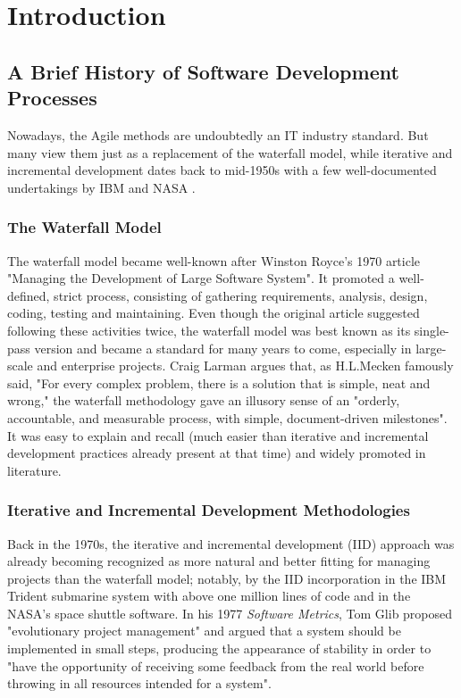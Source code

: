 \documentclass{article}
\begin{document}
\section{Introduction}
\subsection{A Brief History of Software Development Processes}
Nowadays, the Agile methods are undoubtedly an IT industry standard. But many view them just as a replacement of the waterfall model, while iterative and incremental development dates back to mid-1950s with a few well-documented undertakings by IBM and NASA \cite{larman2003iterative}.

\subsubsection{The Waterfall Model}
The waterfall model became well-known after Winston Royce's 1970 article "Managing the Development of Large Software System". It promoted a well-defined, strict process, consisting of gathering requirements, analysis, design, coding, testing and maintaining. Even though the original article suggested following these activities twice, the waterfall model was best known as its single-pass version and became a standard for many years to come, especially in large-scale and enterprise projects. Craig Larman \cite{larman2003iterative} argues that, as H.L.Mecken famously said, "For every complex problem, there is a solution that is simple, neat and wrong," the waterfall methodology gave an illusory sense of an "orderly, accountable, and measurable process, with simple, document-driven milestones". It was easy to explain and recall (much easier than iterative and incremental development practices already present at that time) and widely promoted in literature.

\subsubsection{Iterative and Incremental Development Methodologies}
Back in the 1970s, the iterative and incremental development (IID) approach was already becoming recognized as more natural and better fitting for managing projects than the waterfall model; notably, by the IID incorporation in the IBM Trident submarine system with above one million lines of code and in the NASA's space shuttle software. In his 1977 \textit{Software Metrics}, Tom Glib proposed "evolutionary project management" and argued that a system should be implemented in small steps, producing the appearance of stability in order to "have the opportunity of receiving some feedback from the real world before throwing in all resources intended for a system".\cite{glib1977,p.214}
\end{document}
